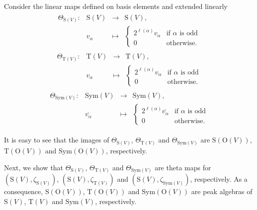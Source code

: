 \documentclass[12pt]{amsart}
\numberwithin{equation}{section}
\newcommand{\Sym}{\mathrm{Sym}}
\newcommand{\rmO}{\mathrm{O}}
\newcommand{\rmT}{\mathrm{T}}
\newcommand{\rmS}{\mathrm{S}}
\begin{document}
Consider the linear maps defined on basis elements and extended linearly
\begin{align*}
\begin{array}{cccc} 
\Theta_{\rmS(V)}:&\rmS(V)&\rightarrow& \rmS(V),\\
& v_\alpha &\mapsto& \begin{cases} 
2^{\ell(\alpha)}v_\alpha& \text{if $\alpha$ is odd}\\
0 & \text{otherwise.}
\end{cases}
\end{array}
\end{align*}
\begin{align*}
\begin{array}{cccc} 
	\Theta_{\rmT(V)}:&\rmT(V)&\rightarrow& \rmT(V),\\
	& v_\alpha &\mapsto& \begin{cases} 
		2^{\ell(\alpha)}v_\alpha& \text{if $\alpha$ is odd}\\
		0 & \text{otherwise.}
	\end{cases}
\end{array}
\end{align*}
\begin{align*}
\begin{array}{cccc} 
	\Theta_{\Sym(V)}:&\Sym(V)&\rightarrow& \Sym(V),\\
	& \overline{v_\alpha} &\mapsto& \begin{cases} 
		2^{\ell(\alpha)}\overline{v_\alpha}& \text{if $\alpha$ is odd}\\
		0 & \text{otherwise.}
	\end{cases}
\end{array}
\end{align*}

It is easy to see that the images of $\Theta_{\rmS(V)}$, $\Theta_{\rmT(V)}$ and $\Theta_{\Sym(V)}$ are $\rmS(\rmO(V))$, $\rmT(\rmO(V))$ and $\Sym(\rmO(V))$, respectively.

Next, we show that $\Theta_{\rmS(V)}$, $\Theta_{\rmT(V)}$ and $\Theta_{\Sym(V)}$ are theta maps for $(\rmS(V),\zeta_{\rmS(V)})$, $(\rmS(V),\zeta_{\rmT(V)})$ and $(\rmS(V),\zeta_{\Sym(V)})$, respectively. As a consequence, $\rmS(\rmO(V))$, $\rmT(\rmO(V))$ and $\Sym(\rmO(V))$ are peak algebras of $\rmS(V)$, $\rmT(V)$ and $\Sym(V)$, respectively.
\end{document}
